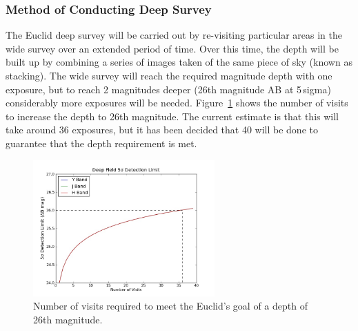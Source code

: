 	\subsubsection{Method of Conducting Deep Survey} %
	\label{ssub:method_of_conducting_deep_survey}
		The Euclid deep survey will be carried out by re-visiting particular areas in the wide survey over an extended period of time. Over this time, the depth will be built up by combining a series of images taken of the same piece of sky (known as stacking). The wide survey will reach the required magnitude depth with one exposure, but to reach 2 magnitudes deeper (26th magnitude AB at 5\,sigma) considerably more exposures will be needed. Figure~\ref{fig:euclid_visits_magnitude} shows the number of visits to increase the depth to 26th magnitude. The current estimate is that this will take around 36 exposures, but it has been decided that 40 will be done to guarantee that the depth requirement is met\cite{NISP_Performance_Analysis_ReportEUCL}.
		\begin{figure}[!htbp]
			\begin{center}
				\includegraphics[width=0.62\textwidth]{../Images/Euclid_visits_magnitude.jpg}
			\end{center}
			\caption{Number of visits required to meet the Euclid's goal of a depth of 26th magnitude.\label{fig:euclid_visits_magnitude}}
		\end{figure}

